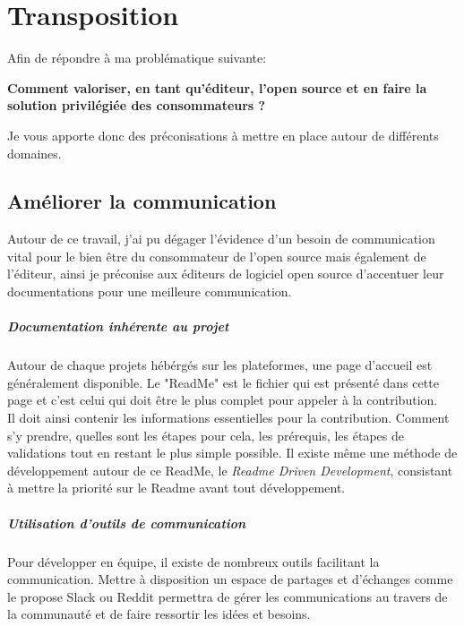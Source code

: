 \chapter{Transposition} %

Afin de répondre à ma problématique suivante:

\textbf{Comment valoriser, en tant qu'éditeur, l'open source et en faire la solution privilégiée des consommateurs ?}

Je vous apporte donc des préconisations à mettre en place autour de différents domaines.

\section{Améliorer la communication}

	Autour de ce travail, j'ai pu dégager l'évidence d'un besoin de communication vital pour le bien être du consommateur de l'open source mais également de l'éditeur, ainsi je préconise aux éditeurs de logiciel open source d'accentuer leur documentations pour une meilleure communication.

	\paragraph{Documentation inhérente au projet\\}

	Autour de chaque projets hébérgés sur les plateformes, une page d'accueil est généralement disponible. Le "ReadMe" est le fichier qui est présenté dans cette page et c'est celui qui doit être le plus complet pour appeler à la contribution.\\

	Il doit ainsi contenir les informations essentielles pour la contribution. Comment s'y prendre, quelles sont les étapes pour cela, les prérequis, les étapes de validations tout en restant le plus simple possible. Il existe même une méthode de développement autour de ce ReadMe, le \emph{Readme Driven Development}, consistant à mettre la priorité sur le Readme avant tout développement.

	\paragraph{Utilisation d'outils de communication\\}

	Pour développer en équipe, il existe de nombreux outils facilitant la communication. Mettre à disposition un espace de partages et d'échanges comme le propose Slack ou Reddit permettra de gérer les communications au travers de la communauté et de faire ressortir les idées et besoins.

